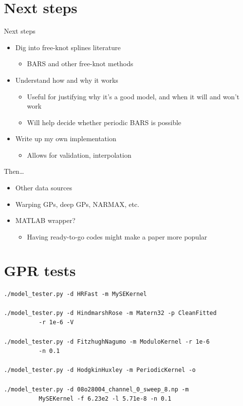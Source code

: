 \documentclass[presentation]{beamer}
\begin{document}
\section{Next steps}
\label{sec:orgb73c317}
\begin{frame}[label={sec:orge295d5c}]{Next steps}
\begin{itemize}[<+->]
\item Dig into free-knot splines literature
\begin{itemize}
\item BARS and other free-knot methods
\end{itemize}
\item Understand how and why it works
\begin{itemize}
\item Useful for justifying why it's a good model, and when it will and won't work
\item Will help decide whether periodic BARS is possible
\end{itemize}
\item Write up my own implementation
\begin{itemize}
\item Allows for validation, interpolation
\end{itemize}
\end{itemize}

Then\ldots{}
\begin{itemize}[<+->]
\item Other data sources
\item Warping GPs, deep GPs, NARMAX, etc.
\item MATLAB wrapper?
\begin{itemize}
\item Having ready-to-go codes might make a paper more popular
\end{itemize}
\end{itemize}
\end{frame}


\section{GPR tests}
\label{sec:orgf7b5f33}

\begin{verbatim}
./model_tester.py -d HRFast -m MySEKernel

./model_tester.py -d HindmarshRose -m Matern32 -p CleanFitted 
		  -r 1e-6 -V

./model_tester.py -d FitzhughNagumo -m ModuloKernel -r 1e-6 
		  -n 0.1

./model_tester.py -d HodgkinHuxley -m PeriodicKernel -o

./model_tester.py -d 08o28004_channel_0_sweep_8.np -m 
		  MySEKernel -f 6.23e2 -l 5.71e-8 -n 0.1
\end{verbatim}
\end{document}

